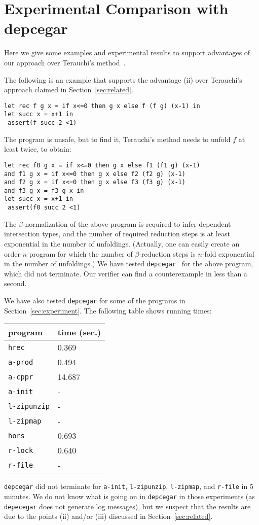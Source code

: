 \section{Experimental Comparison with depcegar}
\label{sec:depcegar}

Here we give some examples and experimental results
to support advantages of our approach over Terauchi's 
method~\cite{Terauchi2010}. 

The following is an example that supports the 
advantage (ii) over Terauchi's approach claimed in Section~\ref{sec:related}.
\begin{verbatim}
let rec f g x = if x<=0 then g x else f (f g) (x-1) in
let succ x = x+1 in
 assert(f succ 2 <1)
\end{verbatim}
The program is unsafe, but to find it, 
Terauchi's method needs to unfold \(f\) at least twice, to obtain:
\begin{verbatim}
let rec f0 g x = if x<=0 then g x else f1 (f1 g) (x-1) 
and f1 g x = if x<=0 then g x else f2 (f2 g) (x-1) 
and f2 g x = if x<=0 then g x else f3 (f3 g) (x-1) 
and f3 g x = f3 g x in
let succ x = x+1 in
 assert(f0 succ 2 <1)
\end{verbatim}
The \(\beta\)-normalization of the above program is required to infer 
dependent intersection types, and the number of required reduction steps is
at least exponential in the number of unfoldings.
(Actually, one can easily create an order-\(n\) program for which the number
of \(\beta\)-reduction steps is \(n\)-fold exponential in the number of unfoldings.)
We have tested \texttt{depcegar}~\cite{Terauchi2010} for the above program,
which did not terminate.
Our verifier can find a counterexample in less than a second.

We have also tested \texttt{depcegar} for some of the programs in Section~\ref{sec:experiment}.
The following table shows running times:
\begin{center}
\begin{tabular}{|l|l|}
\hline
program & time (sec.) \\
\hline
\texttt{hrec} & 0.369\\
\hline
\texttt{a-prod} & 0.494\\
\hline
\texttt{a-cppr} & 14.687\\
\hline
\texttt{a-init} & -\\
\hline
\texttt{l-zipunzip} & -\\
\hline
\texttt{l-zipmap} & -\\
\hline
\texttt{hors} & 0.693\\
\hline
\texttt{r-lock} & 0.640\\
\hline
\texttt{r-file} & -\\
\hline
\end{tabular}
\end{center}
\texttt{depcegar} did not terminate for \texttt{a-init}, \texttt{l-zipunzip},
\texttt{l-zipmap}, and \texttt{r-file} in 5 minutes.
We do not know what is going on in \texttt{depcegar} in those
experiments (as \texttt{depecegar} does not generate log messages), 
but we suspect that the results are due to the points (ii) and/or (iii) discussed in Section~\ref{sec:related}.


